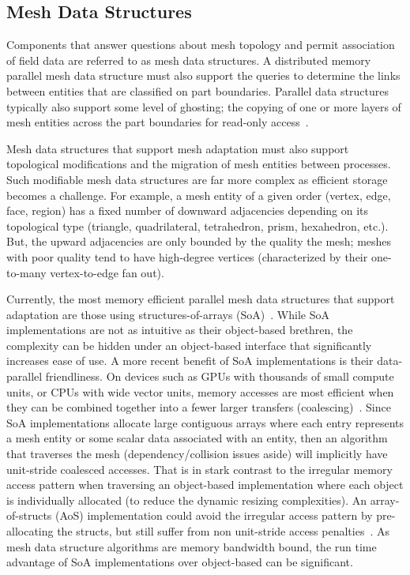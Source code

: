 \subsection{Mesh Data Structures}

Components that answer questions about mesh topology and permit association of
field data are referred to as mesh data structures.
A distributed memory parallel mesh data structure must also support the queries
to determine the links between entities that are classified on part
boundaries.
Parallel data structures typically also support some level of ghosting; the
copying of one or more layers of mesh entities across the part boundaries
for read-only access~\cite{misbahGhosting2013}.

Mesh data structures that support mesh adaptation must also support topological
modifications and the migration of mesh entities between processes.
Such modifiable mesh data structures are far more complex as efficient storage
becomes a challenge.
For example, a mesh entity of a given order (vertex, edge, face, region) has a
fixed number of downward adjacencies depending on its topological type
(triangle, quadrilateral, tetrahedron, prism, hexahedron, etc.).
But, the upward adjacencies are only bounded by the quality the mesh; meshes
with poor quality tend to have high-degree vertices (characterized by their
one-to-many vertex-to-edge fan out).

Currently, the most memory efficient parallel mesh data structures that support
adaptation are those using structures-of-arrays (SoA)~\cite{ibanez2016pumi}.
While SoA implementations are not as intuitive as their object-based brethren,
the complexity can be hidden under an object-based interface that significantly
increases ease of use.
A more recent benefit of SoA implementations is their data-parallel
friendliness.
On devices such as GPUs with thousands of small compute units, or CPUs with wide
vector units, memory accesses are most efficient when they can be combined
together into a fewer larger transfers
(coalescing)~\cite{nickolls2008scalable,karlRuppStridedAccess}.
Since SoA implementations allocate large contiguous arrays where each entry
represents a mesh entity or some scalar data associated with an entity, then an
algorithm that traverses the mesh (dependency/collision issues aside) will
implicitly have unit-stride coalesced accesses.
That is in stark contrast to the irregular memory access pattern when
traversing an object-based implementation where each object is individually
allocated (to reduce the dynamic resizing complexities).
An array-of-structs (AoS) implementation could avoid the irregular access
pattern by pre-allocating the structs, but still suffer from non unit-stride
access penalties~\cite{karlRuppStridedAccess}.
As mesh data structure algorithms are memory bandwidth bound, the
run time advantage of SoA implementations over object-based can be significant.

